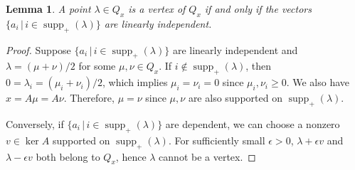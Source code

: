 \documentclass[12pt]{amsart}
\newtheorem{lemma}[theorem]{Lemma}
\numberwithin{equation}{section}
\numberwithin{theorem}{section}
\newcommand{\op}{\operatorname}
\begin{document}
\begin{lemma}
  \label{lemma-vertex-indep}
  A point $\lambda\in Q_x$ is a vertex of $Q_x$ if and only if the vectors $\{a_i\,|\,i\in \op{supp}_+(\lambda)\}$ are linearly independent.
\end{lemma}
\begin{proof}
  Suppose $\{a_i\,|\,i\in \op{supp}_+(\lambda)\}$ are linearly independent and $\lambda=(\mu+\nu)/2$ for some $\mu,\nu\in Q_x$. If $i\notin \op{supp}_+(\lambda)$, then $0=\lambda_i=(\mu_i+\nu_i)/2$, which implies $\mu_i=\nu_i=0$ since $\mu_i,\nu_i\geq0$.
  We also have $x=A\mu=A\nu$. Therefore, $\mu=\nu$ since $\mu,\nu$ are also supported on $\op{supp}_+(\lambda)$.

  Conversely, if $\{a_i\,|\,i\in \op{supp}_+(\lambda)\}$ are dependent, we can choose a nonzero $v\in\op{ker}A$ supported on $\op{supp}_+(\lambda)$. For sufficiently small $\epsilon>0$, $\lambda+\epsilon v$ and $\lambda-\epsilon v$ both belong to $Q_x$, hence $\lambda$ cannot be a vertex.
\end{proof}
\end{document}
